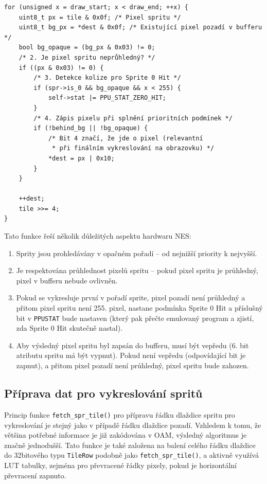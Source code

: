 \begin{listing}[htbp]
\begin{verbatim}
for (unsigned x = draw_start; x < draw_end; ++x) {
    uint8_t px = tile & 0x0f; /* Pixel spritu */
    uint8_t bg_px = *dest & 0x0f; /* Existující pixel pozadí v bufferu */
    bool bg_opaque = (bg_px & 0x03) != 0;
    /* 2. Je pixel spritu neprůhledný? */
    if ((px & 0x03) != 0) {
        /* 3. Detekce kolize pro Sprite 0 Hit */
        if (spr->is_0 && bg_opaque && x < 255) {
            self->stat |= PPU_STAT_ZERO_HIT;
        }
        /* 4. Zápis pixelu při splnění prioritních podmínek */
        if (!behind_bg || !bg_opaque) {
            /* Bit 4 značí, že jde o pixel (relevantní
             * při finálním vykreslování na obrazovku) */
            *dest = px | 0x10;
        }
    }

    ++dest;
    tile >>= 4;
}
\end{verbatim}
\caption{Kód pro vykreslení spritu s řešením priority pořadí, Sprite 0 Hit a průhledností.}
\label{lst:render_sprites}
\end{listing}

Tato funkce řeší několik důležitých aspektu hardwaru NES:

\begin{enumerate}
    \item Sprity jsou prohledávány v opačném pořadí -- od nejnižší priority k nejvyšší.
    \item Je respektována průhlednost pixelů spritu -- pokud pixel spritu je průhledný, pixel v
        bufferu nebude ovlivněn.
    \item Pokud se vykresluje první v pořadí sprite, pixel pozadí není průhledný a přitom pixel
        spritu není 255. pixel, nastane podmínka Sprite 0 Hit a příslušný bit v \texttt{PPUSTAT}
        bude nastaven (který pak přečte emulovaný program a zjistí, zda Sprite 0 Hit skutečně
        nastal).
    \item Aby výsledný pixel spritu byl zapsán do bufferu, musí být vepředu (6. bit atributu
        spritu má být vypnut). Pokud není vepředu (odpovídající bit je zapnut), a přitom pixel
        pozadí není průhledný, pixel spritu bude zahozen.
\end{enumerate}

\subsection{Příprava dat pro vykreslování spritů}

Princip funkce \texttt{fetch\_spr\_tile()} pro přípravu řádku dlaždice spritu pro vykreslování je
stejný jako v případě řádku dlaždice pozadí. Vzhledem k tomu, že většina potřebné informace je již
zakódována v OAM, výsledný algoritmus je značně jednodušší. Tato funkce je také založena na balení
celého řádku dlaždice do 32bitového typu \texttt{TileRow} podobně jako \texttt{fetch\_spr\_tile()}, a
aktivně využívá LUT tabulky, zejména pro převracené řádky pixely, pokud je horizontální převracení
zapnuto.


